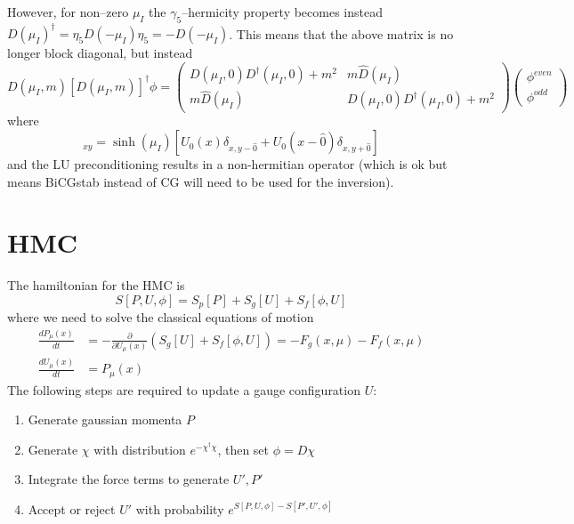 \documentclass[a4paper,12pt]{article}
\begin{document}
However, for non--zero $\mu_I$ the $\gamma_5$--hermicity property becomes instead $D(\mu_I)^{\dagger} = \eta_5 D(-\mu_I) \eta_5 = -D(-\mu_I)$. This means that the above matrix is 
no longer block diagonal, but instead 
\begin{equation}
D(\mu_I,m) [D(\mu_I,m)]^{\dagger} \phi = 
\begin{pmatrix}
D(\mu_I,0)D^{\dagger}(\mu_I,0) + m^2 & m\hat D(\mu_I) \\
 m\hat D(\mu_I) & D(\mu_I,0)D^{\dagger}(\mu_I,0) + m^2
\end{pmatrix}
\begin{pmatrix}
\phi^{even} \\
\phi^{odd}
\end{pmatrix}
\end{equation}
where
\begin{equation}
 [\hat D(\mu_I)]_{xy} = \sinh(\mu_I)\left[U_0(x)\delta_{x,y-\hat0} + U_0(x-\hat0)\delta_{x,y+\hat0}\right]
\end{equation}
and the LU preconditioning results in a non-hermitian operator (which is ok but means BiCGstab instead of CG will need to be used for the inversion).

\section{HMC}
The hamiltonian for the HMC is
\begin{equation}
 S[P, U, \phi] = S_p[P] + S_g[U] + S_f[\phi, U]
\end{equation}
where we need to solve the classical equations of motion
\begin{align}
 \frac{dP_{\mu}(x)}{dt} &= -\frac{\partial}{\partial U_{\mu}(x)}\left(S_g[U] + S_f[\phi, U]\right) = -F_g(x,\mu) - F_f(x,\mu) \\
 \frac{dU_{\mu}(x)}{dt} &= P_{\mu}(x)
\end{align}
The following steps are required to update a gauge configuration $U$:
\begin{enumerate}
 \item Generate gaussian momenta $P$
 \item Generate $\chi$ with distribution $e^{-\chi^{\dagger}\chi}$, then set $\phi = D\chi$
 \item Integrate the force terms to generate $U', P'$
 \item Accept or reject $U'$ with probability $e^{S[P, U, \phi] - S[P', U', \phi]}$
\end{enumerate}
\end{document}
